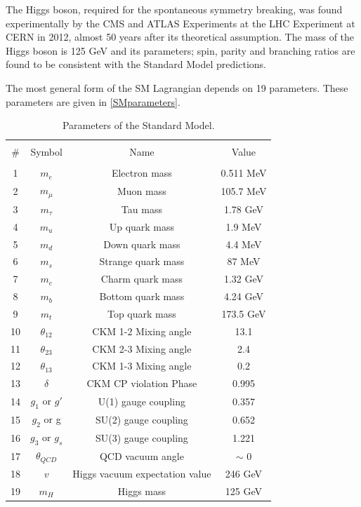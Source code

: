 The Higgs boson, required for the spontaneous symmetry breaking, was found experimentally by the CMS and ATLAS Experiments at the LHC Experiment at CERN\cite{HiggsCMS,HiggsATLAS} in 2012, almost 50 years after its theoretical assumption. The mass of the Higgs boson is 125 GeV and its parameters; spin, parity and branching ratios are found to be consistent with the Standard Model predictions\cite{Higgsprecision1, Higgsprecision2}.

The most general form of the SM Lagrangian depends on 19 parameters. These parameters are given in \autoref{SMparameters}.
\begin{table}[ht]
	{\setlength{\tabcolsep}{14pt}
		\caption{Parameters of the Standard Model.}
		\begin{center}
			\vspace{-6mm}
			\begin{tabular}{cccc}
				\hline \\[-2.45ex] \hline \\[-2.1ex]
				\# & Symbol & Name & Value \\
				\hline \\[-1.8ex]
				1 & $m_e$ & Electron mass & 0.511 MeV \\
				2 & $m_\mu$ & Muon mass & 105.7 MeV \\
				3 & $m_\tau$ & Tau mass & 1.78 GeV \\
				4 & $m_u$ & Up quark mass & 1.9 MeV \\
				5 & $m_d$ & Down quark mass & 4.4 MeV \\
				6 & $m_s$ & Strange quark mass & 87 MeV \\
				7 & $m_c$ & Charm quark mass & 1.32 GeV \\
				8 & $m_b$ & Bottom quark mass & 4.24 GeV \\
				9 & $m_t$ & Top quark mass & 173.5 GeV \\
				10 & $\theta_{12}$ & CKM 1-2 Mixing angle & 13.1\textdegree \\
				11 & $\theta_{23}$ & CKM 2-3 Mixing angle & 2.4\textdegree \\
				12 & $\theta_{13}$ & CKM 1-3 Mixing angle & 0.2\textdegree \\
				13 & $\delta$ & CKM CP violation Phase & 0.995 \\
				14 & $g_1$ or $g\prime$ & U(1) gauge coupling & 0.357 \\
				15 & $g_2$ or g & SU(2) gauge coupling & 0.652 \\
				16 & $g_3$ or $g_s$ & SU(3) gauge coupling & 1.221 \\
				17 & $\theta_{QCD}$ & QCD vacuum angle & $\sim $ 0 \\
				18 & $v$ & Higgs vacuum expectation value & 246 GeV \\
				19 & $m_H$ & Higgs mass & 125 GeV \\
				\hline
			\end{tabular}
			\vspace{-6mm}
		\end{center}
		\label{SMparameters}}
\end{table}

